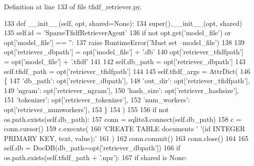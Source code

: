 Definition at line 133 of file tfidf\+\_\+retriever.\+py.


\begin{DoxyCode}
133     \textcolor{keyword}{def }\_\_init\_\_(self, opt, shared=None):
134         super().\_\_init\_\_(opt, shared)
135         self.id = \textcolor{stringliteral}{'SparseTfidfRetrieverAgent'}
136         \textcolor{keywordflow}{if} \textcolor{keywordflow}{not} opt.get(\textcolor{stringliteral}{'model\_file'}) \textcolor{keywordflow}{or} opt[\textcolor{stringliteral}{'model\_file'}] == \textcolor{stringliteral}{''}:
137             \textcolor{keywordflow}{raise} RuntimeError(\textcolor{stringliteral}{'Must set --model\_file'})
138 
139         opt[\textcolor{stringliteral}{'retriever\_dbpath'}] = opt[\textcolor{stringliteral}{'model\_file'}] + \textcolor{stringliteral}{'.db'}
140         opt[\textcolor{stringliteral}{'retriever\_tfidfpath'}] = opt[\textcolor{stringliteral}{'model\_file'}] + \textcolor{stringliteral}{'.tfidf'}
141 
142         self.db\_path = opt[\textcolor{stringliteral}{'retriever\_dbpath'}]
143         self.tfidf\_path = opt[\textcolor{stringliteral}{'retriever\_tfidfpath'}]
144 
145         self.tfidf\_args = AttrDict(
146             \{
147                 \textcolor{stringliteral}{'db\_path'}: opt[\textcolor{stringliteral}{'retriever\_dbpath'}],
148                 \textcolor{stringliteral}{'out\_dir'}: opt[\textcolor{stringliteral}{'retriever\_tfidfpath'}],
149                 \textcolor{stringliteral}{'ngram'}: opt[\textcolor{stringliteral}{'retriever\_ngram'}],
150                 \textcolor{stringliteral}{'hash\_size'}: opt[\textcolor{stringliteral}{'retriever\_hashsize'}],
151                 \textcolor{stringliteral}{'tokenizer'}: opt[\textcolor{stringliteral}{'retriever\_tokenizer'}],
152                 \textcolor{stringliteral}{'num\_workers'}: opt[\textcolor{stringliteral}{'retriever\_numworkers'}],
153             \}
154         )
155 
156         \textcolor{keywordflow}{if} \textcolor{keywordflow}{not} os.path.exists(self.db\_path):
157             conn = sqlite3.connect(self.db\_path)
158             c = conn.cursor()
159             c.execute(
160                 \textcolor{stringliteral}{'CREATE TABLE documents '} \textcolor{stringliteral}{'(id INTEGER PRIMARY KEY, text, value);'}
161             )
162             conn.commit()
163             conn.close()
164 
165         self.db = DocDB(db\_path=opt[\textcolor{stringliteral}{'retriever\_dbpath'}])
166         \textcolor{keywordflow}{if} os.path.exists(self.tfidf\_path + \textcolor{stringliteral}{'.npz'}):
167             \textcolor{keywordflow}{if} shared \textcolor{keywordflow}{is} \textcolor{keywordtype}{None}:

\end{DoxyCode}

